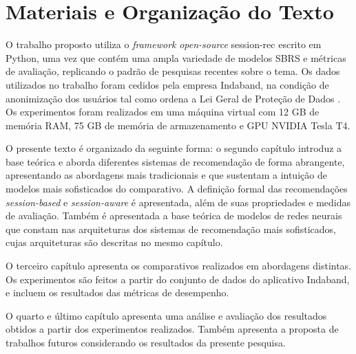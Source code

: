 \section{Materiais e Organização do Texto}

O trabalho proposto utiliza o \textit{framework} \textit{open-source}
session-rec \cite{sessionrec} escrito em Python, uma vez que contém uma ampla
variedade de modelos SBRS e métricas de avaliação, replicando o padrão de
pesquisas recentes sobre o tema. Os dados utilizados no trabalho foram cedidos
pela empresa Indaband, na condição de anonimização dos usuários tal como ordena
a Lei Geral de Proteção de Dados \cite{lgpd}. Os experimentos foram realizados
em uma máquina virtual com 12 GB de memória RAM, 75 GB de memória de
armazenamento e GPU NVIDIA Tesla T4.

O presente texto é organizado da seguinte forma: o segundo capítulo introduz a
base teórica e aborda diferentes sistemas de recomendação de forma abrangente,
apresentando as abordagens mais tradicionais e que sustentam a intuição de
modelos mais sofisticados do comparativo. A definição formal das recomendações
\textit{session-based} e \textit{session-aware} é apresentada, além de suas propriedades
e medidas de avaliação. Também é apresentada a base teórica de modelos de redes
neurais que constam nas arquiteturas dos sistemas de recomendação mais sofisticados,
cujas arquiteturas são descritas no mesmo capítulo.


O terceiro capítulo apresenta os comparativos realizados em abordagens
distintas. Os experimentos são feitos a partir do conjunto de dados do
aplicativo Indaband, e incluem os resultados das métricas de desempenho.


O quarto e último capítulo apresenta uma análise e avaliação dos resultados
obtidos a partir dos experimentos realizados. Também apresenta a proposta de
trabalhos futuros considerando os resultados da presente pesquisa.

